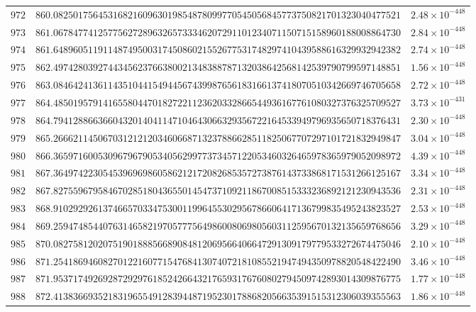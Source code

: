 \documentclass[12pt,reqno]{amsart}
\theoremstyle{remark}
\begin{document}
\begin{longtable}{clc}
$972$ & $860.0825017564531682160963019854878099770545056845773750821701323040477521$ & $2.48\times 10^{-448}$ \\
$973$ & $861.0678477412577562728963265733346207291101234071150715158960188008864730$ & $2.84\times 10^{-448}$ \\
$974$ & $861.6489605119114874950031745086021552677531748297410439588616329932942382$ & $2.74\times 10^{-448}$ \\
$975$ & $862.4974280392744345623766380021348388787132038642568142539790799597148851$ & $1.56\times 10^{-448}$ \\
$976$ & $863.0846424136114351044154944567439987656183166137418070510342669746705658$ & $2.72\times 10^{-448}$ \\
$977$ & $864.4850195791416558044701827221123620332866544936167761080327376325709527$ & $3.73\times 10^{-431}$ \\
$978$ & $864.7941288663660432014041147104643066329356722164533949796935650718376431$ & $2.30\times 10^{-448}$ \\
$979$ & $865.2666211450670312121203460668713237886628511825067707297101721832949847$ & $3.04\times 10^{-448}$ \\
$980$ & $866.3659716005309679679053405629977373457122053460326465978365979052098972$ & $4.39\times 10^{-448}$ \\
$981$ & $867.3649742230545396969860586212172082685357273876143733868171531266125167$ & $3.34\times 10^{-448}$ \\
$982$ & $867.8275596795846702851804365501454737109211867008515333236892121230943536$ & $2.31\times 10^{-448}$ \\
$983$ & $868.9102929261374665703347530011996455302956786606417136799835495243823527$ & $2.53\times 10^{-448}$ \\
$984$ & $869.2594748544076314658219705777564986008069805603112595670132135659768656$ & $3.29\times 10^{-448}$ \\
$985$ & $870.0827581202075190188856689084812069566406647291309179779533272674475046$ & $2.10\times 10^{-448}$ \\
$986$ & $871.2541869460827012216077154768413074072181085521947494350978820548422490$ & $3.46\times 10^{-448}$ \\
$987$ & $871.9537174926928729297618524266432176593176760802794509742893014309876775$ & $1.77\times 10^{-448}$ \\
$988$ & $872.4138366935218319655491283944871952301788682056635391515312306039355563$ & $1.86\times 10^{-448}$ \\

\end{longtable}
\end{document}
